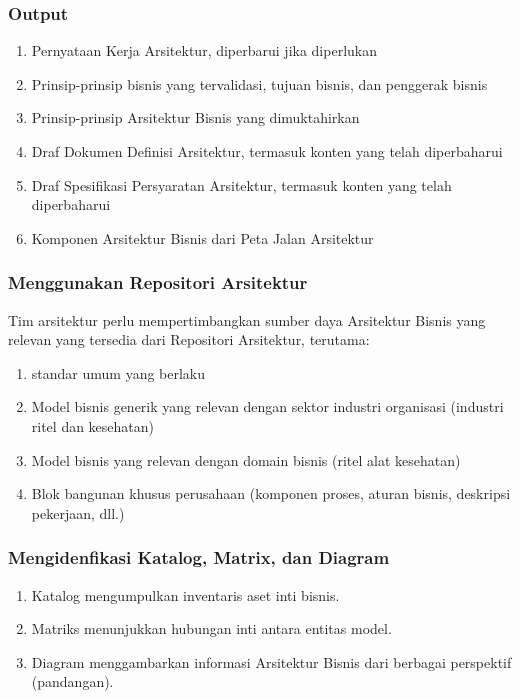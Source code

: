 \documentclass[aspectratio=169]{beamer}
\begin{document}
	\begin{frame}
		\frametitle{Output}
		\begin{enumerate}
			\item Pernyataan Kerja Arsitektur, diperbarui jika diperlukan
			\item Prinsip-prinsip bisnis yang tervalidasi, tujuan bisnis, dan penggerak bisnis
			\item Prinsip-prinsip Arsitektur Bisnis yang dimuktahirkan
			\item Draf Dokumen Definisi Arsitektur, termasuk konten yang telah diperbaharui 
			\item Draf Spesifikasi Persyaratan Arsitektur, termasuk konten yang telah diperbaharui 
			\item Komponen Arsitektur Bisnis dari Peta Jalan Arsitektur 
		\end{enumerate}
	\end{frame}
	
	\begin{frame}
		\frametitle{Menggunakan Repositori Arsitektur}
		Tim arsitektur perlu mempertimbangkan sumber daya Arsitektur Bisnis yang relevan yang tersedia dari Repositori Arsitektur, terutama:
		\begin{enumerate}
			\item standar umum yang berlaku
			\item Model bisnis generik yang relevan dengan sektor industri organisasi (industri ritel dan kesehatan)
			\item Model bisnis yang relevan dengan domain bisnis (ritel alat kesehatan)
			\item Blok bangunan khusus perusahaan (komponen proses, aturan bisnis, deskripsi pekerjaan, dll.)
			
		\end{enumerate}
	\end{frame}
	
	
	\begin{frame}
		\frametitle{Mengidenfikasi Katalog, Matrix, dan Diagram}
		\begin{enumerate}
			\item Katalog mengumpulkan inventaris aset inti bisnis. 
			\item Matriks menunjukkan hubungan inti antara entitas model. 
			\item Diagram menggambarkan informasi Arsitektur Bisnis dari berbagai perspektif (pandangan).
		\end{enumerate}
	\end{frame}	
	
\end{document}
